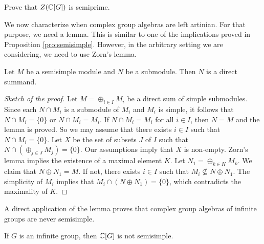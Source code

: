 \begin{exercise}
	Prove that $Z(\mathbb{C}[G])$ is semiprime.
\end{exercise}

We now characterize when complex group algebras 
are left artinian. For that purpose,
we need a lemma. This is similar to one of the implications proved in Proposition \ref{pro:semisimple}. However,
in the arbitrary setting we are considering, we need to use Zorn's lemma. 

\begin{lemma}
    Let $M$ be a semisimple module and $N$ be a submodule. 
    Then $N$ is a direct summand.
\end{lemma}

\begin{proof}[Sketch of the proof]
    Let $M=\oplus_{i\in I}M_i$ be a direct sum of simple submodules. 
    Since each $N\cap M_i$ is a submodule of $M_i$ and $M_i$ is simple, it follows
    that $N\cap M_i=\{0\}$ or $N\cap M_i=M_i$. If
    $N\cap M_i=M_i$ for all $i\in I$, then $N=M$ and the lemma is proved. So we may assume
    that there exists $i\in I$ such that $N\cap M_i=\{0\}$. Let $X$ be the set
    of subsets $J$ of $I$ such that $N\cap (\oplus_{j\in J}M_j)=\{0\}$. Our assumptions
    imply that $X$ is non-empty. Zorn's lemma implies the existence of 
    a maximal element $K$. Let $N_1=\oplus_{k\in K}M_k$. We claim that
    $N\oplus N_1=M$. If not, there exists $i\in I$ such that
    $M_i\not\subseteq N\oplus N_1$. The simplicity of $M_i$ implies that
    $M_i\cap (N\oplus N_1)=\{0\}$, which contradicts the maximality of $K$. 
\end{proof}

A direct application of the lemma proves that
complex group algebras of infinite groups are never semisimple. 

\begin{proposition}
    \label{pro:KGsemisimple}
    If $G$ is an infinite group, then $\mathbb{C}[G]$ is not semisimple. 
\end{proposition}

